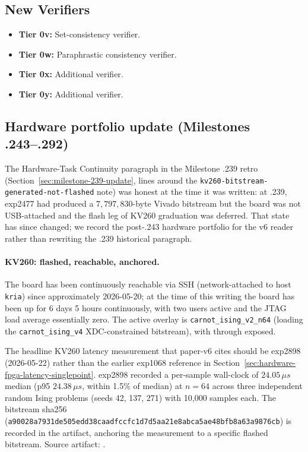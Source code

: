 \documentclass[10pt]{article}
\begin{document}
\subsection{New Verifiers}

\begin{itemize}
    \item \textbf{Tier 0v:} Set-consistency verifier.
    \item \textbf{Tier 0w:} Paraphrastic consistency verifier.
    \item \textbf{Tier 0x:} Additional verifier.
    \item \textbf{Tier 0y:} Additional verifier.
\end{itemize}

\subsection{Hardware portfolio update (Milestones .243--.292)}
\label{sec:hardware-portfolio-update}

The Hardware-Task Continuity paragraph in the Milestone .239 retro
(Section~\ref{sec:milestone-239-update}, lines around the
\texttt{kv260-bitstream-generated-not-flashed} note) was honest at
the time it was written: at .239, exp2477 had produced a
$7{,}797{,}830$-byte Vivado bitstream but the board was not
USB-attached and the flash leg of KV260 graduation was deferred.
That state has since changed; we record the post-.243 hardware
portfolio for the v6 reader rather than rewriting the .239
historical paragraph.

\paragraph{KV260: flashed, reachable, anchored.}
The board has been continuously reachable via SSH (network-attached
to host \texttt{kria}) since approximately 2026-05-20; at the time
of this writing the board has been up for 6 days 5 hours
continuously, with two users active and the JTAG load average
essentially zero. The active overlay is
\texttt{carnot\_ising\_v2\_n64} (loading the
\texttt{carnot\_ising\_v4} XDC-constrained bitstream), with
 through  exposed.

The headline KV260 latency measurement that paper-v6 cites should
be exp2898 (2026-05-22) rather than the earlier exp1068 reference
in Section~\ref{sec:hardware-fpga-latency-singlepoint}. exp2898
recorded a per-sample wall-clock of $24.05\,\mu s$ median (p95
$24.38\,\mu s$, within 1.5\% of median) at $n=64$ across three
independent random Ising problems (seeds 42, 137, 271) with 10{,}000
samples each. The bitstream sha256
(\texttt{a90028a7931de505edd38caadfccfc1d7d5aa21e8abca5ae48bfb8a63a9876cb})
is recorded in the artifact, anchoring the measurement to a
specific flashed bitstream. Source artifact:
.
\end{document}
